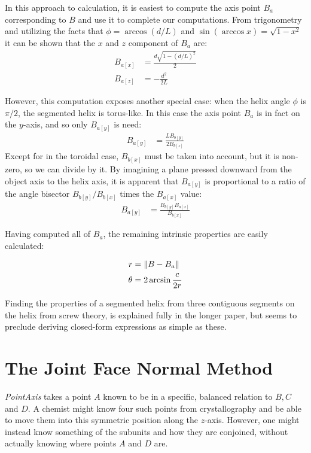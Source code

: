 \documentclass{svproc}
\DeclarePairedDelimiter{\norm}{\lVert}{\rVert}
\begin{document}
In this approach to calculation, it is easiest
to compute the axis point $B_a$ corresponding to $B$ and
use it to complete our computations.
From trigonometry and utilizing the facts that $\phi = \arccos{(d/L)}$  and $\sin{(\arccos{x})} = \sqrt{1 - x^2}$ it
can be shown that
the $x$ and $z$ component of $B_a$ are:
\begin{align}
  B_{a[x]} &= \frac{d\sqrt{1 - (d/L)^2}}{2} \\
  B_{a[z]} &= -\frac{d^2}{2L}
\end{align}

However, this computation exposes another special case: when the
helix angle $\phi$ is $\pi /2$, the segmented helix is
torus-like. In this case the axis point $B_a$ is in fact
on the $y$-axis, and so only $B_{a[y]}$ is need:
\begin{align}
  B_{a[y]} &=  \frac{L B_{b[y]}}{2 B_{b[z]}}
\end{align}
Except for in the toroidal case,  $B_{b[x]}$ must be taken into
account, but it is non-zero, so we can divide by it.
By imagining a plane pressed downward from the
object axis to the helix axis, it is apparent that $B_{a[y]}$
is proportional to a ratio of the angle bisector
$B_{b[y]}/B_{b[x]}$ times the $B_{a[x]}$ value:
\begin{align}
  B_{a[y]} &=  \frac{ B_{b[y]} B_{a[x]}}{ B_{b[x]}}
\end{align}

Having computed all of $B_a$, the remaining intrinsic properties are easily
calculated:

\begin{align}
  r &= \norm{B - B_a}  \\
  \theta &= 2 \arcsin{\frac{c}{2r}}
\end{align}

Finding the properties of a segmented helix from three contiguous segments
on the helix from screw theory\cite{wittenburg2016kinematics,kahn1989defining},
is explained fully in the longer paper\cite{readfullsegmentedhelix}, but seems to preclude deriving closed-form expressions as simple as these.


\section{The Joint Face Normal Method}
\label{sec:facenormal}

{\em PointAxis} takes a point $A$ known to be in a specific, balanced relation
to $B, C$ and $D$. A chemist might know four such points from crystallography
and be able to move them into this symmetric position along the $z$-axis.
However, one might instead know something of the subunits and
how they are conjoined, without actually knowing where points $A$
and $D$ are.
\end{document}
